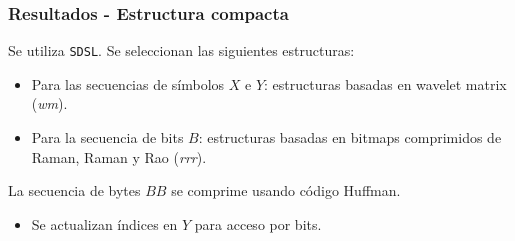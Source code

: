 \begin{frame}
\frametitle{Resultados - Estructura compacta}

Se utiliza \texttt{SDSL}. Se seleccionan las siguientes estructuras:

\begin{itemize}
	\item Para las secuencias de símbolos $X$ e $Y$: estructuras basadas en wavelet matrix (\textit{wm}).
	\item Para la secuencia de bits $B$: estructuras basadas en bitmaps comprimidos de Raman, Raman y Rao (\textit{rrr}).
\end{itemize}

La secuencia de bytes $BB$ se comprime usando código Huffman.
\begin{itemize}
	\item Se actualizan índices en $Y$ para acceso por bits.
\end{itemize}


\end{frame}


%
%	
%
%





%
%


